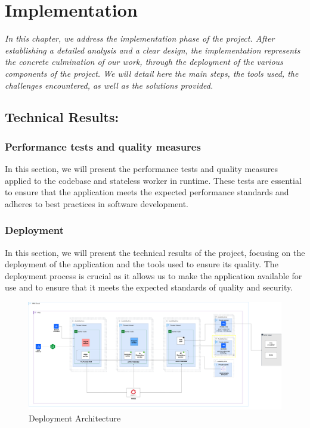 \chapter{Implementation}
\textit{In this chapter, we address the implementation phase of the project. After establishing a detailed analysis and a clear design, the implementation represents the concrete culmination of our work, through the deployment of the various components of the project. We will detail here the main steps, the tools used, the challenges encountered, as well as the solutions provided.}
\pagebreak


\newpage

\section{Technical Results:}


\subsection{Performance tests and quality measures}
In this section, we will present the performance tests and quality measures applied to the codebase and stateless worker in runtime. These tests are essential to ensure that the application meets the expected performance standards and adheres to best practices in software development.
\subsection{Deployment}
In this section, we will present the technical results of the project, focusing on the deployment of the application and the tools used to ensure its quality. 
The deployment process is crucial as it allows us to make the application available for use and to ensure that it meets the expected standards of quality and security.


\begin{figure}
    \centering
    \includegraphics[width=1\textwidth]{img/arch/p2s-workers-deployment.drawio.png}
    \caption{Deployment Architecture}
    \label{fig:deployment}
\end{figure}
  
